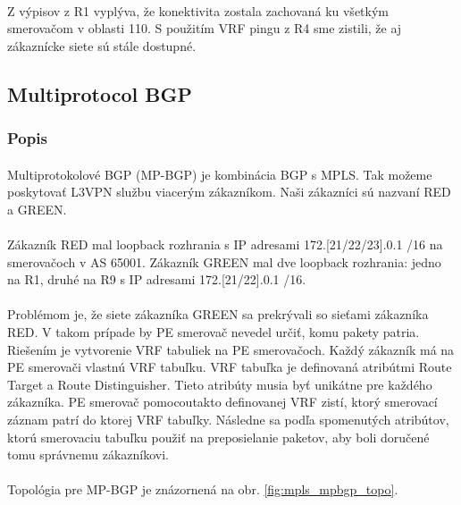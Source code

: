 \documentclass[12pt,twoside,a4paper]{report}
\begin{document}
\paragraph{}
Z výpisov z R1 vyplýva, že konektivita zostala zachovaná ku všetkým smerovačom v oblasti 110. S použitím VRF pingu z R4 sme zistili, že aj zákaznícke siete sú stále dostupné.










\subsection{Multiprotocol BGP}
\subsubsection{Popis}
\paragraph{}
Multiprotokolové BGP (MP-BGP) je kombinácia BGP s MPLS. Tak možeme poskytovať L3VPN službu viacerým zákazníkom. Naši zákazníci sú nazvaní RED a GREEN.

\paragraph{}
Zákazník RED mal loopback rozhrania s IP adresami 172.[21/22/23].0.1 /16 na smerovačoch v AS 65001. Zákazník GREEN mal dve loopback rozhrania: jedno na R1, druhé na R9 s IP adresami 172.[21/22].0.1 /16.

\paragraph{}
Problémom je, že siete zákazníka GREEN sa prekrývali so sieťami zákazníka RED. V takom prípade by PE smerovač nevedel určiť, komu pakety patria. Riešením je vytvorenie VRF tabuliek na PE smerovačoch. Každý zákazník má na PE smerovači vlastnú VRF tabuľku. VRF tabuľka je definovaná atribútmi Route Target a Route Distinguisher. Tieto atribúty musia byť unikátne pre každého zákazníka. PE smerovač pomocoutakto definovanej VRF zistí, ktorý smerovací záznam patrí do ktorej VRF tabuľky. Následne sa podľa spomenutých atribútov, ktorú smerovaciu tabuľku použiť na preposielanie paketov, aby boli doručené tomu správnemu zákazníkovi.

\paragraph{}
Topológia pre MP-BGP je znázornená na obr. \ref{fig:mpls_mpbgp_topo}.
\end{document}

